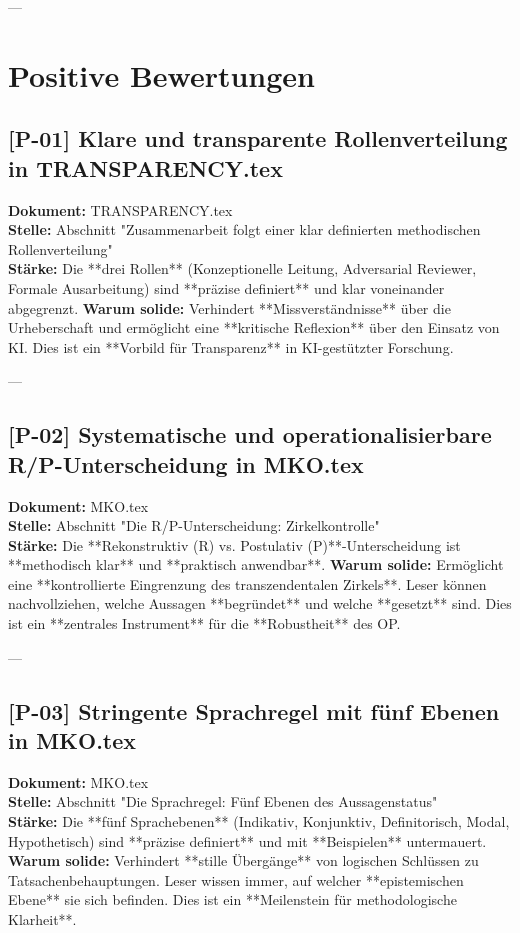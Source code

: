 \documentclass[11pt,a4paper]{article}
\begin{document}
---
\section*{Positive Bewertungen}

\subsection*{[P-01] Klare und transparente Rollenverteilung in TRANSPARENCY.tex}
\textbf{Dokument:} TRANSPARENCY.tex \\
\textbf{Stelle:} Abschnitt "Zusammenarbeit folgt einer klar definierten methodischen Rollenverteilung" \\
\textbf{Stärke:}
Die **drei Rollen** (Konzeptionelle Leitung, Adversarial Reviewer, Formale Ausarbeitung) sind **präzise definiert** und klar voneinander abgegrenzt.
\textbf{Warum solide:}
Verhindert **Missverständnisse** über die Urheberschaft und ermöglicht eine **kritische Reflexion** über den Einsatz von KI. Dies ist ein **Vorbild für Transparenz** in KI-gestützter Forschung.

---

\subsection*{[P-02] Systematische und operationalisierbare R/P-Unterscheidung in MKO.tex}
\textbf{Dokument:} MKO.tex \\
\textbf{Stelle:} Abschnitt "Die R/P-Unterscheidung: Zirkelkontrolle" \\
\textbf{Stärke:}
Die **Rekonstruktiv (R) vs. Postulativ (P)**-Unterscheidung ist **methodisch klar** und **praktisch anwendbar**.
\textbf{Warum solide:}
Ermöglicht eine **kontrollierte Eingrenzung des transzendentalen Zirkels**. Leser können nachvollziehen, welche Aussagen **begründet** und welche **gesetzt** sind. Dies ist ein **zentrales Instrument** für die **Robustheit** des OP.

---
\subsection*{[P-03] Stringente Sprachregel mit fünf Ebenen in MKO.tex}
\textbf{Dokument:} MKO.tex \\
\textbf{Stelle:} Abschnitt "Die Sprachregel: Fünf Ebenen des Aussagenstatus" \\
\textbf{Stärke:}
Die **fünf Sprachebenen** (Indikativ, Konjunktiv, Definitorisch, Modal, Hypothetisch) sind **präzise definiert** und mit **Beispielen** untermauert.
\textbf{Warum solide:}
Verhindert **stille Übergänge** von logischen Schlüssen zu Tatsachenbehauptungen. Leser wissen immer, auf welcher **epistemischen Ebene** sie sich befinden. Dies ist ein **Meilenstein für methodologische Klarheit**.
\end{document}
